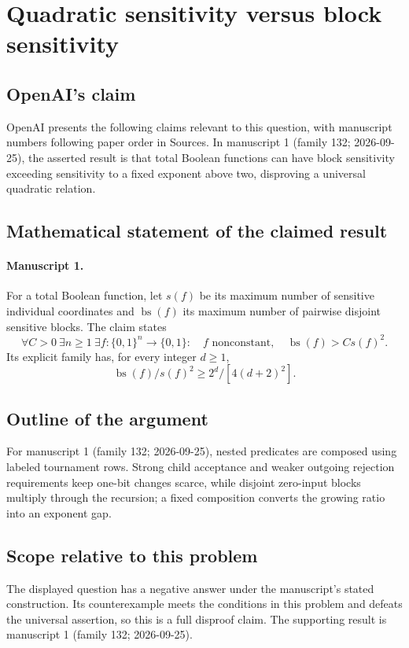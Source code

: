 \documentclass[11pt]{article}
\begin{document}
\section*{Quadratic sensitivity versus block sensitivity}

\subsection{OpenAI's claim}
OpenAI presents the following claims relevant to this question, with manuscript numbers following paper order in Sources. In manuscript 1 (family 132; 2026-09-25), the asserted result is that total Boolean functions can have block sensitivity exceeding sensitivity to a fixed exponent above two, disproving a universal quadratic relation.

\subsection{Mathematical statement of the claimed result}
\paragraph{Manuscript 1.}
For a total Boolean function, let $s(f)$ be its maximum number of sensitive individual coordinates and $\operatorname{bs}(f)$ its maximum number of pairwise disjoint sensitive blocks. The claim states
\[
 \forall C>0\ \exists n\ge1\ \exists f:\{0,1\}^n\to\{0,1\}:\quad
 f\text{ nonconstant},\quad\operatorname{bs}(f)>C s(f)^2.
\]
Its explicit family has, for every integer $d\ge1$,
\[
 \operatorname{bs}(f)/s(f)^2\ge 2^d/[4(d+2)^2].
\]

\subsection{Outline of the argument}
For manuscript 1 (family 132; 2026-09-25), nested predicates are composed using labeled tournament rows. Strong child acceptance and weaker outgoing rejection requirements keep one-bit changes scarce, while disjoint zero-input blocks multiply through the recursion; a fixed composition converts the growing ratio into an exponent gap.

\subsection{Scope relative to this problem}
The displayed question has a negative answer under the manuscript's stated construction. Its counterexample meets the conditions in this problem and defeats the universal assertion, so this is a full disproof claim. The supporting result is manuscript 1 (family 132; 2026-09-25).
\end{document}

